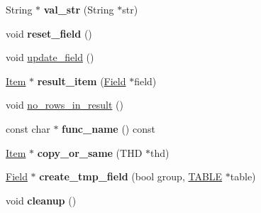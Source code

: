 \begin{DoxyCompactItemize}
\mbox{\label{classItem__sum__avg_a6125e6b3b24fe29a6998b0c8233c53f9}} 
String $\ast$ {\bfseries val\+\_\+str} (String $\ast$str)
\item 
\mbox{\label{classItem__sum__avg_ae3bb1318716959311aae2245d42ac3ec}} 
void {\bfseries reset\+\_\+field} ()
\item 
void \mbox{\hyperlink{classItem__sum__avg_a682bfcb0bec9487bcd2c26d1aa200aa5}{update\+\_\+field}} ()
\item 
\mbox{\label{classItem__sum__avg_a3ca856f5a4fa1a89c6c1e089e5dfa26b}} 
\mbox{\hyperlink{classItem}{Item}} $\ast$ {\bfseries result\+\_\+item} (\mbox{\hyperlink{classField}{Field}} $\ast$field)
\item 
void \mbox{\hyperlink{classItem__sum__avg_ab4cfa5a3c42abc40f7f3fdb95c92d568}{no\+\_\+rows\+\_\+in\+\_\+result}} ()
\item 
\mbox{\label{classItem__sum__avg_a769a9bc5b8b189988784cccac2077937}} 
const char $\ast$ {\bfseries func\+\_\+name} () const
\item 
\mbox{\label{classItem__sum__avg_abb69b9bd0d07c7839f705dfc386eb3d2}} 
\mbox{\hyperlink{classItem}{Item}} $\ast$ {\bfseries copy\+\_\+or\+\_\+same} (T\+HD $\ast$thd)
\item 
\mbox{\label{classItem__sum__avg_a606f50b1c4c2108ee90f98e5f8df916f}} 
\mbox{\hyperlink{classField}{Field}} $\ast$ {\bfseries create\+\_\+tmp\+\_\+field} (bool group, \mbox{\hyperlink{structTABLE}{T\+A\+B\+LE}} $\ast$table)
\item 
\mbox{\label{classItem__sum__avg_aa659dabc75b85576b74e6dcc352c3810}} 
void {\bfseries cleanup} ()
\end{DoxyCompactItemize}
